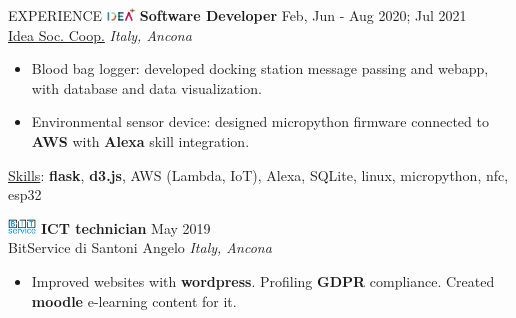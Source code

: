 \documentclass{cv} %
\def\intraexpvspace{0.15cm}
\def\titlelistvspace{-0.15cm}
\begin{document}
\begin{rSection}{EXPERIENCE}
    \includegraphics[width=0.75cm, trim={0cm 1.5cm 0cm 0cm}]{idea-icon.png}
    \textbf{Software Developer} \hfill Feb, Jun - Aug 2020; Jul 2021\\
    \hspace*{0.85cm}\href{https://idea-on-line.it/}{Idea Soc. Coop.} \hfill \textit{Italy, Ancona}
    \vspace{\titlelistvspace}\begin{itemize}
        \itemsep -3pt {}
        \item Blood bag logger: developed docking station message passing and webapp, with database and data visualization.
        \item Environmental sensor device: designed micropython firmware
              connected to \textbf{AWS}
              with \textbf{Alexa} skill integration.
    \end{itemize}
    \vspace*{-0.1cm}\hspace*{0.5cm}\underline{Skills}:
    \textbf{flask},
    \textbf{d3.js},
    AWS (Lambda, IoT),
    Alexa,
    SQLite,
    linux,
    micropython,
    nfc,
    esp32
    \vspace{\intraexpvspace}

    \includegraphics[width=0.75cm, trim={0cm 1.5cm 0cm 0cm}]{bitservice-icon.png}
    \textbf{ICT technician} \hfill May 2019 \\
    \hspace*{0.85cm}BitService di Santoni Angelo \hfill \textit{Italy, Ancona}
    \vspace{\titlelistvspace}\begin{itemize}
        \itemsep -3pt {}
        \item Improved websites with \textbf{wordpress}.
              Profiling \textbf{GDPR} compliance.
              Created \textbf{moodle} e-learning content for it. %
    \end{itemize}

\end{rSection}
\end{document}
